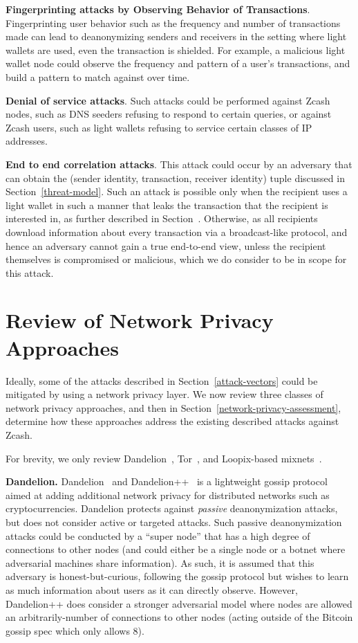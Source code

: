 \documentclass{article}
\begin{document}
\textbf{Fingerprinting attacks by Observing Behavior of Transactions}.
Fingerprinting user behavior such as the frequency and number of transactions
made can lead to deanonymizing senders and receivers in the setting where light
wallets are used, even the transaction is shielded.
For example, a malicious light wallet node could observe
the frequency and pattern of a user’s transactions, and build a pattern to
match against over time.

\textbf{Denial of service attacks}. Such attacks could be performed against
Zcash nodes, such as DNS seeders refusing to respond to certain queries, or
against Zcash users, such as light wallets refusing to service certain classes
of IP addresses.

\textbf{End to end correlation attacks}. This attack could occur by an
adversary that can obtain the (sender identity, transaction, receiver identity)
tuple discussed in Section~\ref{threat-model}. Such an attack is possible
only when the recipient uses a light wallet in such a manner that leaks the
transaction that the recipient is interested in, as further described in
Section~\cite{light-wallet-spec}. Otherwise, as all recipients download information about every
transaction via a broadcast-like protocol, and hence an adversary cannot gain a
true end-to-end view, unless the recipient themselves is compromised or
malicious, which we do consider to be in scope for this attack.


\section{Review of Network Privacy Approaches}
\label{network-privacy-review}

Ideally, some of the attacks described in Section~\ref{attack-vectors} could be
mitigated by using a network privacy layer. We now review three
classes of network privacy approaches, and then in
Section~\ref{network-privacy-assessment}, determine how these approaches
address the existing described attacks against Zcash.

For brevity, we only review
Dandelion~\cite{Fanti:2018:DLC,BojjaVenkatakrishnan:2017:DRB},
Tor~\cite{tor-specification}, and
Loopix-based mixnets~\cite{Piotrowska:2017:LAS}.

\textbf{Dandelion.}
Dandelion~\cite{BojjaVenkatakrishnan:2017:DRB} and
Dandelion++~\cite{Fanti:2018:DLC} is a lightweight gossip protocol aimed at
adding additional network privacy for
distributed networks such as cryptocurrencies. Dandelion protects against
\emph{passive}
deanonymization attacks, but does not consider active or targeted attacks. Such
passive deanonymization attacks could be conducted by a ``super node'' that has
a high degree of connections to other nodes (and could either be a single node
or a botnet where adversarial machines share information). As such, it is
assumed that this adversary is honest-but-curious, following the gossip protocol
but wishes to learn as much information about users as it can directly observe.
However, Dandelion++ does consider a stronger adversarial model where nodes are
allowed an arbitrarily-number of connections to other nodes (acting outside of the
Bitcoin gossip spec which only allows 8).
\end{document}
